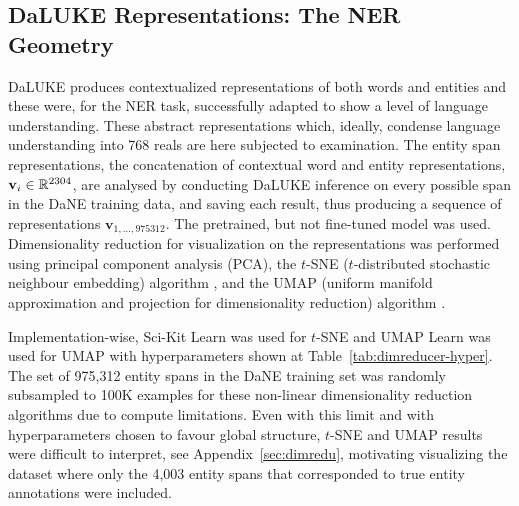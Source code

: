 \documentclass[main.tex]{subfiles}
\begin{document}
\subsection{DaLUKE Representations: The NER Geometry}
DaLUKE produces contextualized representations of both words and entities and these were, for the NER task, successfully adapted to show a level of language understanding.
These abstract representations which, ideally, condense language understanding into 768 reals are here subjected to examination.
The entity span representations, the concatenation of contextual word and entity representations, $\mathbf v_i \in \mathbb R^{2304}$, are analysed by conducting DaLUKE inference on every possible span in the DaNE training data, and saving each result, thus producing a sequence of representations $\mathbf v_{1, \ldots, 975312}$.
The pretrained, but not fine-tuned model was used.
Dimensionality reduction for visualization on the representations was performed using principal component analysis (PCA), the $t$-SNE ($t$-distributed stochastic neighbour embedding) algorithm \cite{maaten2008tsne}, and the UMAP (uniform manifold approximation and projection for dimensionality reduction) algorithm \cite{mcinnes2020umap}.

Implementation-wise, Sci-Kit Learn was used for $t$-SNE \cite{pedregosa2011scikit} and UMAP Learn was used for UMAP \cite{mcinnes2018umap-software} with hyperparameters shown at Table~\ref{tab:dimreducer-hyper}.
The set of 975,312 entity spans in the DaNE training set was randomly subsampled to 100K examples for these non-linear dimensionality reduction algorithms due to compute limitations.
Even with this limit and with hyperparameters chosen to favour global structure, $t$-SNE and UMAP results were difficult to interpret, see Appendix~\ref{sec:dimredu}, motivating visualizing the dataset where only the 4,003 entity spans that corresponded to true entity annotations were included.
\end{document}
